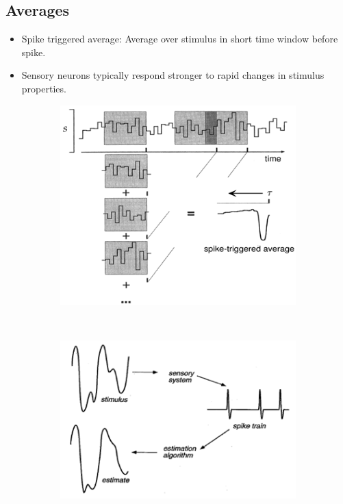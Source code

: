 \documentclass[a4paper, 12pt]{article}
\begin{document}
\subsection{Averages}
\begin{itemize}[noitemsep,nolistsep]
	\item Spike triggered average: Average over stimulus in short time window before spike.
	\item Sensory neurons typically respond stronger to rapid changes in stimulus properties.
\end{itemize}
\begin{figure}[H]
	\centering
	\begin{subfigure}[b]{0.5\textwidth}
		\centering
		\includegraphics[width=\textwidth]{spike-triggered-average.png}
	\end{subfigure}%
	~
	\begin{subfigure}[b]{0.5\textwidth}
		\centering
		\includegraphics[width=\textwidth]{stimulus-estimation.png}
	\end{subfigure}
\end{figure}
\end{document}
